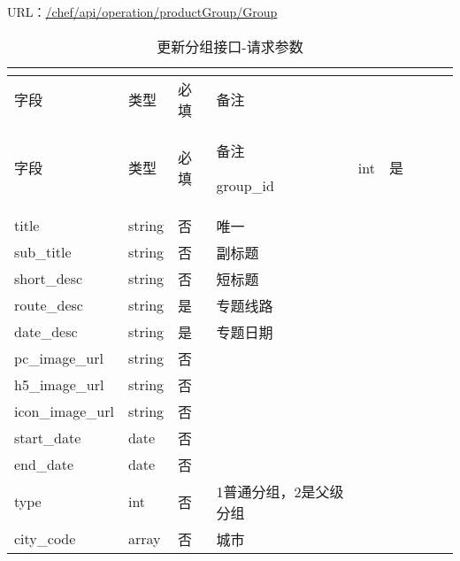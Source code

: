URL：\url{/chef/api/operation/productGroup/Group}


\begin{longtable}{|m{80pt}|m{40pt}|m{50pt}|m{150pt}|}
\tabularnewline\hline
字段&类型&必填&备注
\endhead

\caption{更新分组接口-请求参数}\\
\hline
字段&类型&必填&备注
\endfirsthead

\endfoot

\endlastfoot
\hline
group\_id	&int		&是	&\\
\hline
title			&string	&否	&唯一\\
\hline
sub\_title	&string	&否	&副标题\\
\hline
short\_desc	&string	&否	&短标题\\
\hline
route\_desc	&string	&是	&专题线路\\
\hline
date\_desc	&string	&是	&专题日期\\
\hline
pc\_image\_url&string	&否	&\\
\hline
h5\_image\_url&string	&否	&\\
\hline
icon\_image\_url&string&否	&\\
\hline
start\_date	&date	&否	&\\
\hline
end\_date	&date	&否	&\\
\hline
type			&int		&否	&1普通分组，2是父级分组\\
\hline
city\_code	&array	&否	&城市\\
\hline
\end{longtable}


